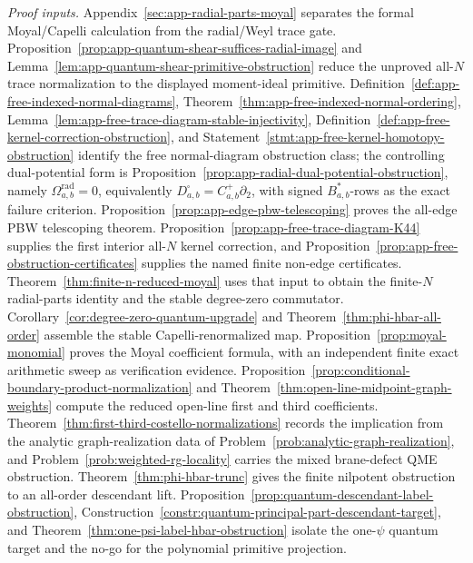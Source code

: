 \begin{stmt}
  \emph{Proof inputs.}
  Appendix~\ref{sec:app-radial-parts-moyal} separates the formal
  Moyal/Capelli calculation from the radial/Weyl trace gate.
  Proposition~\ref{prop:app-quantum-shear-suffices-radial-image} and
  Lemma~\ref{lem:app-quantum-shear-primitive-obstruction} reduce the
  unproved all-\(N\) trace normalization to the displayed
  moment-ideal primitive.
  Definition~\ref{def:app-free-indexed-normal-diagrams},
  Theorem~\ref{thm:app-free-indexed-normal-ordering},
  Lemma~\ref{lem:app-free-trace-diagram-stable-injectivity},
  Definition~\ref{def:app-free-kernel-correction-obstruction}, and
  Statement~\ref{stmt:app-free-kernel-homotopy-obstruction} identify the
  free normal-diagram obstruction class; the controlling
  dual-potential form is
  Proposition~\ref{prop:app-radial-dual-potential-obstruction}, namely
  \(\Omega^{\mathrm{rad}}_{a,b}=0\), equivalently
  \(D^\square_{a,b}=C^+_{a,b}\partial_2\), with signed
  \(B_{a,b}^*\)-rows as the exact failure criterion.
  Proposition~\ref{prop:app-edge-pbw-telescoping} proves the all-edge PBW
  telescoping theorem.  Proposition~\ref{prop:app-free-trace-diagram-K44}
  supplies the first interior all-\(N\) kernel correction, and
  Proposition~\ref{prop:app-free-obstruction-certificates} supplies the
  named finite non-edge certificates.
  Theorem~\ref{thm:finite-n-reduced-moyal} uses that input to obtain
  the finite-\(N\) radial-parts identity and the stable degree-zero
  commutator.
  Corollary~\ref{cor:degree-zero-quantum-upgrade} and
  Theorem~\ref{thm:phi-hbar-all-order} assemble the stable
  Capelli-renormalized map.  Proposition~\ref{prop:moyal-monomial}
  proves the Moyal coefficient formula, with an independent finite exact
  arithmetic sweep as verification evidence.  Proposition~\ref{prop:conditional-boundary-product-normalization}
  and Theorem~\ref{thm:open-line-midpoint-graph-weights} compute
  the reduced open-line first and third coefficients.
  Theorem~\ref{thm:first-third-costello-normalizations} records the
  implication from the analytic graph-realization data of
  Problem~\ref{prob:analytic-graph-realization}, and
  Problem~\ref{prob:weighted-rg-locality} carries the mixed
  brane-defect QME obstruction.  Theorem~\ref{thm:phi-hbar-trunc}
  gives the finite nilpotent obstruction to an all-order descendant
  lift.  Proposition~\ref{prop:quantum-descendant-label-obstruction},
  Construction~\ref{constr:quantum-principal-part-descendant-target},
  and Theorem~\ref{thm:one-psi-label-hbar-obstruction} isolate
  the one-\(\psi\) quantum target and the no-go for the polynomial
  primitive projection.


\end{stmt}
